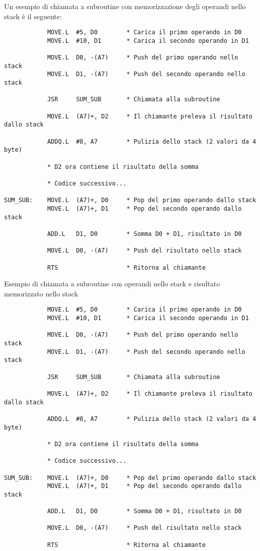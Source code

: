 Un esempio di chiamata a subroutine con memorizzazione degli operandi nello stack è il seguente:
\begin{lstlisting}
            MOVE.L  #5, D0        * Carica il primo operando in D0
            MOVE.L  #10, D1       * Carica il secondo operando in D1

            MOVE.L  D0, -(A7)     * Push del primo operando nello stack
            MOVE.L  D1, -(A7)     * Push del secondo operando nello stack

            JSR     SUM_SUB       * Chiamata alla subroutine

            MOVE.L  (A7)+, D2     * Il chiamante preleva il risultato dallo stack

            ADDQ.L  #8, A7        * Pulizia dello stack (2 valori da 4 byte)

            * D2 ora contiene il risultato della somma

            * Codice successivo...

SUM_SUB:    MOVE.L  (A7)+, D0     * Pop del primo operando dallo stack
            MOVE.L  (A7)+, D1     * Pop del secondo operando dallo stack

            ADD.L   D1, D0        * Somma D0 + D1, risultato in D0

            MOVE.L  D0, -(A7)     * Push del risultato nello stack

            RTS                   * Ritorna al chiamante
\end{lstlisting}

Esempio di chiamata a subroutine con operandi nello stack e risultato memorizzato nello stack
\begin{lstlisting}
            MOVE.L  #5, D0        * Carica il primo operando in D0
            MOVE.L  #10, D1       * Carica il secondo operando in D1

            MOVE.L  D0, -(A7)     * Push del primo operando nello stack
            MOVE.L  D1, -(A7)     * Push del secondo operando nello stack

            JSR     SUM_SUB       * Chiamata alla subroutine

            MOVE.L  (A7)+, D2     * Il chiamante preleva il risultato dallo stack

            ADDQ.L  #8, A7        * Pulizia dello stack (2 valori da 4 byte)

            * D2 ora contiene il risultato della somma

            * Codice successivo...

SUM_SUB:    MOVE.L  (A7)+, D0     * Pop del primo operando dallo stack
            MOVE.L  (A7)+, D1     * Pop del secondo operando dallo stack

            ADD.L   D1, D0        * Somma D0 + D1, risultato in D0

            MOVE.L  D0, -(A7)     * Push del risultato nello stack

            RTS                   * Ritorna al chiamante
\end{lstlisting}


